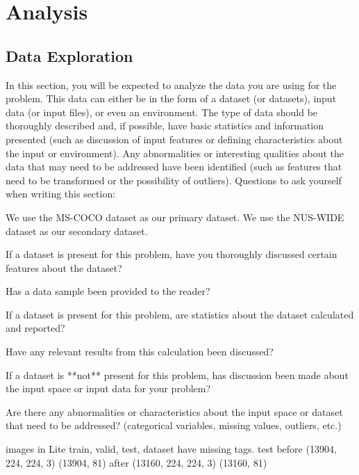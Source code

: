 \documentclass[12pt,journal,compsoc]{IEEEtran}
\begin{document}

\section{Analysis} %
\subsection{Data Exploration}
In this section, you will be expected to analyze the data you are using for the problem. This data can either be in the form of a dataset (or datasets), input data (or input files), or even an environment. The type of data should be thoroughly described and, if possible, have basic statistics and information presented (such as discussion of input features or defining characteristics about the input or environment). Any abnormalities or interesting qualities about the data that may need to be addressed have been identified (such as features that need to be transformed or the possibility of outliers). Questions to ask yourself when writing this section:

We use the MS-COCO\cite{MSCOCO} dataset as our primary dataset.
We use the NUS-WIDE\cite{nus-wide-civr09} dataset as our secondary dataset.

If a dataset is present for this problem, have you thoroughly discussed certain features about the dataset? 

Has a data sample been provided to the reader?

If a dataset is present for this problem, are statistics about the dataset calculated and reported? 

Have any relevant results from this calculation been discussed?

If a dataset is **not** present for this problem, has discussion been made about the input space or input data for your problem?

Are there any abnormalities or characteristics about the input space or dataset that need to be addressed? (categorical variables, missing values, outliers, etc.)

 images in Lite train, valid, test, dataset have missing tags.
test
before (13904, 224, 224, 3) (13904, 81)
after  (13160, 224, 224, 3) (13160, 81)
\end{document}
